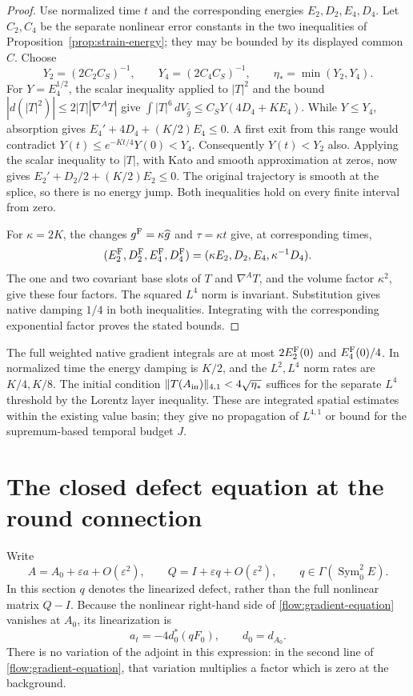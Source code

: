 \documentclass[11pt]{article}
\numberwithin{equation}{section}
\theoremstyle{definition}
\theoremstyle{remark}
\begin{document}
\begin{proof}
Use normalized time \(t\) and the corresponding energies
\(E_2,D_2,E_4,D_4\). Let \(C_2,C_4\) be the separate
nonlinear error constants in the two inequalities of
Proposition~\ref{prop:strain-energy}; they may be bounded
by its displayed common \(C\).
Choose
\[
 Y_2=(2C_2C_S)^{-1},\qquad Y_4=(2C_4C_S)^{-1},\qquad
                  \eta_*=\min(Y_2,Y_4).
\]
For \(Y=E_4^{1/2}\), the scalar inequality applied to
\(|T|^2\) and the bound
\(|d(|T|^2)|\le2|T||\nabla^AT|\) give
\(\int|T|^6\,dV_{\widehat g}\le C_SY(4D_4+KE_4)\).
While \(Y\le Y_4\), absorption gives
\(E_4'+4D_4+(K/2)E_4\le0\).
A first exit from this range would contradict
\(Y(t)\le e^{-Kt/4}Y(0)<Y_4\).
Consequently \(Y(t)<Y_2\) also. Applying the scalar
inequality to \(|T|\), with Kato and smooth approximation
at zeros, now gives
\(E_2'+D_2/2+(K/2)E_2\le0\).
The original trajectory is smooth at the splice, so there
is no energy jump. Both inequalities hold on every finite
interval from zero.

For \(\kappa=2K\), the changes \(g^{\rm F}=\kappa\widehat g\)
and \(\tau=\kappa t\) give, at corresponding times,
\[
 (E_2^{\rm F},D_2^{\rm F},E_4^{\rm F},D_4^{\rm F})
          =(\kappa E_2,D_2,E_4,\kappa^{-1}D_4).
\]
The one and two covariant base slots of \(T\) and
\(\nabla^AT\), and the volume factor \(\kappa^2\),
give these four factors. The squared \(L^4\) norm is
invariant. Substitution gives native damping \(1/4\)
in both inequalities. Integrating with the corresponding
exponential factor proves the stated bounds.
\end{proof}

The full weighted native gradient integrals are at most
\(2E_2^{\rm F}(0)\) and \(E_4^{\rm F}(0)/4\).
In normalized time the energy damping is \(K/2\), and
the \(L^2,L^4\) norm rates are \(K/4,K/8\).
The initial condition
\(\|T(A_{\rm in})\|_{4,1}<4\sqrt{\eta_*}\) suffices for
the separate \(L^4\) threshold by the Lorentz layer inequality.
These are integrated spatial estimates within the existing
value basin; they give no propagation of \(L^{4,1}\) or
bound for the supremum-based temporal budget \(J\).


\section{The closed defect equation at the round connection}
\label{sec:round-defect}

Write
\begin{equation}
 A=A_0+\varepsilon a+O(\varepsilon^2),\qquad
 Q=I+\varepsilon q+O(\varepsilon^2),\qquad
 q\in\Gamma(\operatorname{Sym}^2_0E).
\end{equation}
In this section $q$ denotes the linearized defect, rather than the full
nonlinear matrix $Q-I$.  Because the nonlinear right-hand side of
\eqref{flow:gradient-equation} vanishes at $A_0$, its linearization is
\begin{equation}
 a_t=-4d_0^*(qF_0),\qquad d_0=d_{A_0}.
 \label{flow:linear-connection}
\end{equation}
There is no variation of the adjoint in this expression: in the second
line of \eqref{flow:gradient-equation}, that variation multiplies a
factor which is zero at the background.
\end{document}
